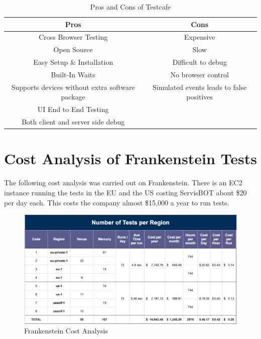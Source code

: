 \documentclass[12pt,a4paper,titlepage]{report}
\begin{document}
\begin{table}[H]
  \centering
  \small
  \setlength\tabcolsep{6pt}
  \begin{tabular}{|c|c|}
    \hline \textbf
    {Pros} & \textbf {Cons}\\
    \hline\hline
    Cross Browser Testing&Expensive\\
    \hline
    Open Source& Slow\\
    \hline
    Easy Setup \& Installation& Difficult to debug\\
    \hline
    Built-In Waits& No browser control\\
    \hline
    Supports devices without extra software package & Simulated events leads to false positives\\
    \hline
    UI End to End Testing\\
    \hline
    Both client and server side debug \\
    \hline
  \end{tabular}
  \caption{Pros and Cons of Testcafe}
\end{table}

\section{Cost Analysis of Frankenstein Tests}

The following cost analysis was carried out on Frankenstein. There is an EC2 instance running the tests in the EU and the US costing ServisBOT about \$20 per day each. This costs the company almost \$15,000 a year to run tests.

\begin{figure}[ht]
  \centering
  \includegraphics[width=\textwidth,height=\textheight,keepaspectratio]{./diagrams/frank_cost_analysis.png}
  \caption{Frankenstein Cost Analysis}
\end{figure}
\end{document}
